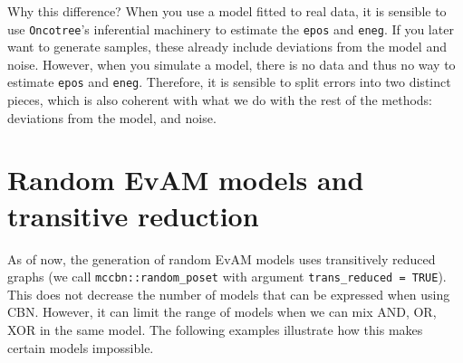 \documentclass[a4paper,11pt]{article}
\begin{document}
Why this difference? When you use a model fitted to real data, it is sensible to use \texttt{Oncotree}'s inferential machinery to estimate the \texttt{epos} and \texttt{eneg}. If you later want to generate samples, these already include deviations from the model and noise. However, when you simulate a model, there is no data and thus no way to estimate  \texttt{epos} and \texttt{eneg}. Therefore, it is sensible to split errors into two distinct pieces, which is also coherent with what we do with the rest of the methods: deviations from the model, and noise.










\section{Random EvAM models and transitive reduction}
\label{sec:random-evam-models}

As of now, the generation of random EvAM models uses transitively reduced graphs (we call \texttt{mccbn::random\_poset} with argument \texttt{trans\_reduced = TRUE}). This does not decrease the number of models that can be expressed when using CBN. However, it can limit the range of models when we can mix AND, OR, XOR in the same model. The following  examples illustrate how this makes certain models impossible.
\end{document}
